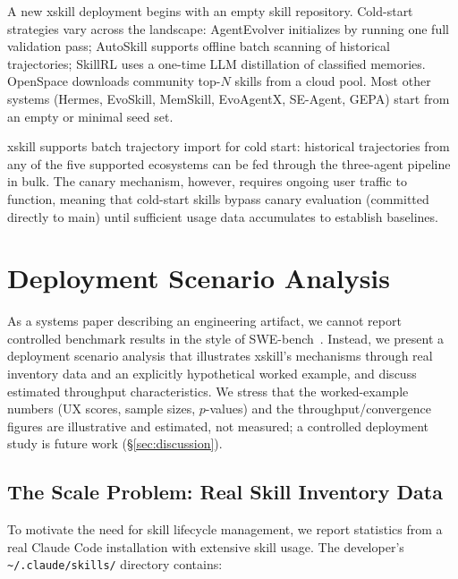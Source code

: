 \documentclass{article}
\begin{document}
A new xskill deployment begins with an empty skill repository. Cold-start strategies vary across the landscape: AgentEvolver initializes by running one full validation pass; AutoSkill supports offline batch scanning of historical trajectories; SkillRL uses a one-time LLM distillation of classified memories. OpenSpace downloads community top-$N$ skills from a cloud pool. Most other systems (Hermes, EvoSkill, MemSkill, EvoAgentX, SE-Agent, GEPA) start from an empty or minimal seed set.

xskill supports batch trajectory import for cold start: historical trajectories from any of the five supported ecosystems can be fed through the three-agent pipeline in bulk. The canary mechanism, however, requires ongoing user traffic to function, meaning that cold-start skills bypass canary evaluation (committed directly to main) until sufficient usage data accumulates to establish baselines.


\section{Deployment Scenario Analysis}
\label{sec:evaluation}

As a systems paper describing an engineering artifact, we cannot report controlled benchmark results in the style of SWE-bench~\citep{jimenez2024swebench}. Instead, we present a deployment scenario analysis that illustrates xskill's mechanisms through real inventory data and an explicitly hypothetical worked example, and discuss estimated throughput characteristics. We stress that the worked-example numbers (UX scores, sample sizes, $p$-values) and the throughput/convergence figures are illustrative and estimated, not measured; a controlled deployment study is future work (\S\ref{sec:discussion}).

\subsection{The Scale Problem: Real Skill Inventory Data}

To motivate the need for skill lifecycle management, we report statistics from a real Claude Code installation with extensive skill usage. The developer's \texttt{\~{}/.claude/skills/} directory contains:
\end{document}
